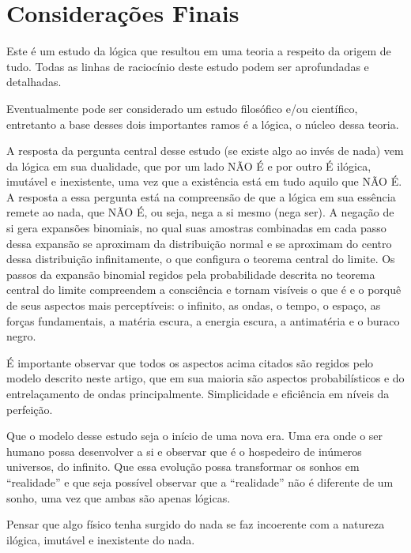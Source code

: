 \section*{Considerações Finais}
Este é um estudo da lógica que resultou em uma teoria a respeito da origem de tudo. Todas as linhas de raciocínio deste estudo podem ser aprofundadas e detalhadas. 

Eventualmente pode ser considerado um estudo filosófico e/ou científico, entretanto a base desses dois importantes ramos é a lógica, o núcleo dessa teoria. 

A resposta da pergunta central desse estudo (se existe algo ao invés de nada) vem da lógica em sua dualidade, que por um lado NÃO É e por outro É ilógica, imutável e inexistente, uma vez que a existência está em tudo aquilo que NÃO É. A resposta a essa pergunta está na compreensão de que a lógica em sua essência remete ao nada, que NÃO É, ou seja, nega a si mesmo (nega ser). A negação de si gera expansões binomiais, no qual suas amostras combinadas em cada passo dessa expansão se aproximam da distribuição normal e se aproximam do centro dessa distribuição infinitamente, o que configura o teorema central do limite. Os passos da expansão binomial regidos pela probabilidade descrita no teorema central do limite compreendem a consciência e tornam visíveis o que é e o porquê de seus aspectos mais perceptíveis: o infinito, as ondas, o tempo, o espaço, as forças fundamentais, a matéria escura, a energia escura, a antimatéria e o buraco negro.

É importante observar que todos os aspectos acima citados são regidos pelo modelo descrito neste artigo, que em sua maioria são aspectos probabilísticos e do entrelaçamento de ondas principalmente. Simplicidade e eficiência em níveis da perfeição.

Que o modelo desse estudo seja o início de uma nova era. Uma era onde o ser humano possa desenvolver a si e observar que é o hospedeiro de inúmeros universos, do infinito. Que essa evolução possa transformar os sonhos em “realidade” e que seja possível observar que a “realidade” não é diferente de um sonho, uma vez que ambas são apenas lógicas.

Pensar que algo físico tenha surgido do nada se faz incoerente com a natureza ilógica, imutável e inexistente do nada.